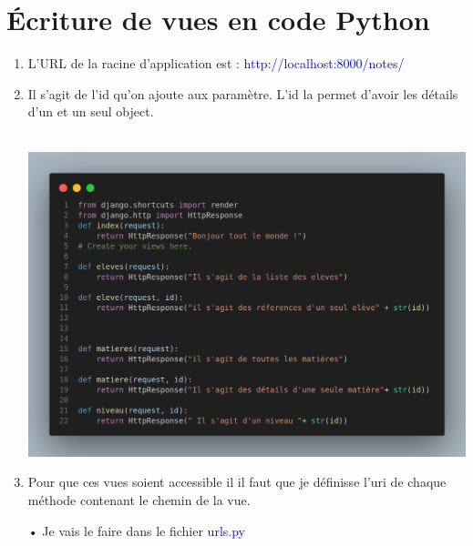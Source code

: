 \documentclass[10pt,a4paper]{article}
\begin{document}
\section{Écriture de vues en code Python}
\begin{enumerate}
\item L'URL de la racine d'application est :  \textcolor{blue}{http://localhost:8000/notes/}

\item Il s'agit de l'id qu'on ajoute aux paramètre. L'id la permet d'avoir les détails d'un et un seul object.\\\\
\begin{center}
\includegraphics[scale=0.26]{1.png}
\end{center}

\item Pour que ces vues soient accessible il il faut que je définisse l'uri de chaque méthode contenant le chemin de la vue.
\item[•] Je vais le faire dans le fichier \textcolor{blue}{urls.py }



\end{enumerate}
\end{document}
